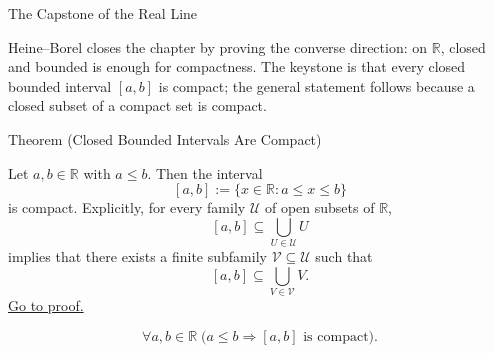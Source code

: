 \label{sec:heine-borel}

\begin{topicbox}{The Capstone of the Real Line}
\begin{exposition}
Heine--Borel closes the chapter by proving the converse direction: on $\mathbb{R}$, closed and bounded is enough for compactness. The keystone is that every closed bounded interval $[a,b]$ is compact; the general statement follows because a closed subset of a compact set is compact.
\end{exposition}
\end{topicbox}
\begin{theorembox}{Theorem (Closed Bounded Intervals Are Compact)}
\begin{theorem}
\label{thm:closed-bounded-interval-compact}
Let $a,b\in\mathbb{R}$ with $a\leq b$.  Then the interval
\[
  [a,b]:=\{x\in\mathbb{R}:a\leq x\leq b\}
\]
is compact.  Explicitly, for every family $\mathcal{U}$ of open subsets of
$\mathbb{R}$,
\[
  [a,b]\subseteq\bigcup_{U\in\mathcal{U}}U
\]
implies that there exists a finite subfamily $\mathcal{V}\subseteq\mathcal{U}$
such that
\[
  [a,b]\subseteq\bigcup_{V\in\mathcal{V}}V.
\]
\hyperref[prf:closed-bounded-interval-compact]{Go to proof.}
\end{theorem}
\end{theorembox}
\begin{remark*}
\[
\forall a,b\in\mathbb{R}\;\bigl(a\leq b \Longrightarrow [a,b]\text{ is compact}\bigr).
\]
\end{remark*}

